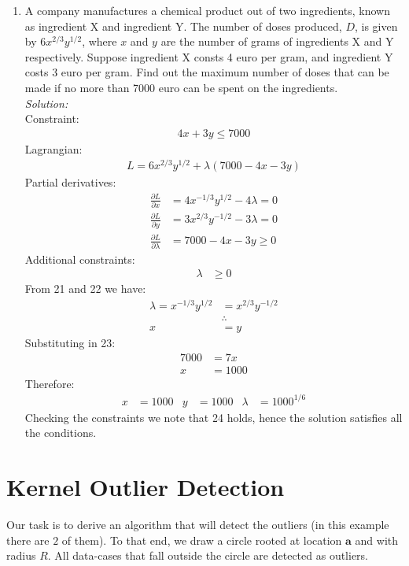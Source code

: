 \documentclass[12pt,a4paper]{article}
\begin{document}
\begin{enumerate}
\item A company manufactures a chemical product out of two ingredients, known as ingredient X and ingredient Y. The number of doses produced, $D$, is given by $6x^{2/3}y^{1/2}$, where $x$ and $y$ are the number of grams of ingredients X and Y respectively. Suppose ingredient X consts {4} euro per gram, and ingredient Y costs 3 euro per gram. Find out the maximum number of doses that can be made if no more than 7000 euro can be spent on the ingredients.\\
	\emph{Solution:} \\
		Constraint:
			\begin{align*}
				4x + 3y \leqslant 7000
			\end{align*}
		Lagrangian:
			\begin{align*}
			L = 6x^{2/3}y^{1/2} + \lambda (7000 -4x -3y)
			\end{align*}
		Partial derivatives:
			\begin{align}
			\frac{\partial L}{\partial x} &= 4x^{-1/3}y^{1/2} - 4\lambda = 0 \\
			\frac{\partial L}{\partial y} &= 3x^{2/3}y^{-1/2} - 3\lambda = 0 \\
			\frac{\partial L}{\partial \lambda} &= 7000 -4x -3y \geqslant 0
			\end{align}
		Additional constraints:
			\begin{align}
			\lambda &\geqslant 0
			\end{align}
		From 21 and 22 we have: 
			\begin{align*}
			\lambda = x^{-1/3}y^{1/2} &= x^{2/3}y^{-1/2} \\
			&\therefore \\
			x &= y
			\end{align*}
		Substituting in 23:
			\begin{align*}
			7000 &= 7x \\
			x &= 1000
			\end{align*}
		Therefore:
			\begin{align*}
			x &= 1000 &
			y &= 1000 &
			\lambda &=  1000^{1/6}
			\end{align*}
		Checking the constraints we note that 24 holds, hence the solution satisfies all the conditions.
\end{enumerate}


\section{Kernel Outlier Detection}
Our task is to derive an algorithm that will detect the outliers (in this example there are $2$ of them). To that end, we draw a circle rooted at location $\boldsymbol{a}$ and with radius $R$. All data-cases that fall outside the circle are detected as outliers.
\end{document}
